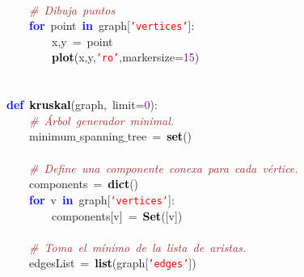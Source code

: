 \mbox{} \\
\mbox{}\ \ \ \ \textit{\textcolor{Brown}{\#\ Dibuja\ puntos}} \\
\mbox{}\ \ \ \ \textbf{\textcolor{Blue}{for}}\ point\ \textbf{\textcolor{Blue}{in}}\ graph\textcolor{BrickRed}{[}\texttt{\textcolor{Red}{'vertices'}}\textcolor{BrickRed}{]:} \\
\mbox{}\ \ \ \ \ \ \ \ x\textcolor{BrickRed}{,}y\ \textcolor{BrickRed}{=}\ point \\
\mbox{}\ \ \ \ \ \ \ \ \textbf{\textcolor{Black}{plot}}\textcolor{BrickRed}{(}x\textcolor{BrickRed}{,}y\textcolor{BrickRed}{,}\texttt{\textcolor{Red}{'ro'}}\textcolor{BrickRed}{,}markersize\textcolor{BrickRed}{=}\textcolor{Purple}{15}\textcolor{BrickRed}{)} \\
\mbox{} \\
\mbox{} \\
\mbox{}\textbf{\textcolor{Blue}{def}}\ \textbf{\textcolor{Black}{kruskal}}\textcolor{BrickRed}{(}graph\textcolor{BrickRed}{,}\ limit\textcolor{BrickRed}{=}\textcolor{Purple}{0}\textcolor{BrickRed}{):} \\
\mbox{}\ \ \ \ \textit{\textcolor{Brown}{\#\ Árbol\ generador\ minimal.}} \\
\mbox{}\ \ \ \ minimum$\_$spanning$\_$tree\ \textcolor{BrickRed}{=}\ \textbf{\textcolor{Black}{set}}\textcolor{BrickRed}{()} \\
\mbox{} \\
\mbox{}\ \ \ \ \textit{\textcolor{Brown}{\#\ Define\ una\ componente\ conexa\ para\ cada\ vértice.}} \\
\mbox{}\ \ \ \ components\ \textcolor{BrickRed}{=}\ \textbf{\textcolor{Black}{dict}}\textcolor{BrickRed}{()} \\
\mbox{}\ \ \ \ \textbf{\textcolor{Blue}{for}}\ v\ \textbf{\textcolor{Blue}{in}}\ graph\textcolor{BrickRed}{[}\texttt{\textcolor{Red}{'vertices'}}\textcolor{BrickRed}{]:} \\
\mbox{}\ \ \ \ \ \ \ \ components\textcolor{BrickRed}{[}v\textcolor{BrickRed}{]}\ \textcolor{BrickRed}{=}\ \textbf{\textcolor{Black}{Set}}\textcolor{BrickRed}{([}v\textcolor{BrickRed}{])} \\
\mbox{}\ \ \ \  \\
\mbox{}\ \ \ \ \textit{\textcolor{Brown}{\#\ Toma\ el\ mínimo\ de\ la\ lista\ de\ aristas.}} \\
\mbox{}\ \ \ \ edgesList\ \textcolor{BrickRed}{=}\ \textbf{\textcolor{Black}{list}}\textcolor{BrickRed}{(}graph\textcolor{BrickRed}{[}\texttt{\textcolor{Red}{'edges'}}\textcolor{BrickRed}{])} \\

